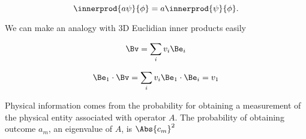 \begin{equation}\label{eqn:PHY356FLecture10:51f}
\innerprod{a \psi}{\phi} = a \innerprod{\psi}{\phi}.
\end{equation}

We can make an analogy with 3D Euclidian inner products easily

\begin{align*}
\Bv = \sum_i v_i \Be_i
\end{align*}

\begin{align*}
\Be_1 \cdot \Bv = \sum_i v_i \Be_1 \cdot \Be_i = v_1
\end{align*}

Physical information comes from the probability for obtaining a measurement of the physical entity associated with operator $A$.  The probability of obtaining outcome $a_m$, an eigenvalue of $A$, is $\Abs{c_m}^2$

